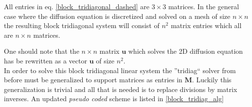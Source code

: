 \noindent All entries in eq. \eqref{block_tridiagonal_dashed} are $3\times3$ matrices. 
In the general case where the diffusion equation is discretized and solved on a mesh of size $n\times n$ the resulting block tridiagonal system will consist of $n^2$ matrix entries which all are $n\times n$ matrices.
% 
% 

One should note that the $n\times n$ matrix $\mathbf u$ which solves the 2D diffusion equation has be rewritten as a vector $\mathbf{u}$ of size $n^2$. \\ 

In order to solve this block tridiagonal linear system the ''tridiag`` solver from before must be generalized to support matrices as entries in $\mathbf M$. 
Luckily this generalization is trivial and all that is needed is to replace divisions by matrix inverses. 
An updated \emph{pseudo coded} scheme is listed in \eqref{block_tridiag_alg}

